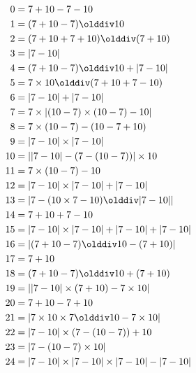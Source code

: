 \allowdisplaybreaks
\begin{align*}
    0   & = 7+10-7-10                                      \\
    1   & = (7+10-7)\olddiv10                              \\
    2   & = (7+10+7+10)\olddiv(7+10)                       \\
    3   & = |7-10|                                         \\
    4   & = (7+10-7)\olddiv10+|7-10|                       \\
    5   & = 7\times10\olddiv(7+10+7-10)                    \\
    6   & = |7-10|+|7-10|                                  \\
    7   & = 7\times|(10-7)\times(10-7)-10|                 \\
    8   & = 7\times(10-7)-(10-7+10)                        \\
    9   & = |7-10|\times|7-10|                             \\
    10  & = ||7-10|-(7-(10-7))|\times10                    \\
    11  & = 7\times(10-7)-10                               \\
    12  & = |7-10|\times|7-10|+|7-10|                      \\
    13  & = |7-(10\times7-10)\olddiv|7-10||                \\
    14  & = 7+10+7-10                                      \\
    15  & = |7-10|\times|7-10|+|7-10|+|7-10|               \\
    16  & = |(7+10-7)\olddiv10-(7+10)|                     \\
    17  & = 7+10                                           \\
    18  & = (7+10-7)\olddiv10+(7+10)                       \\
    19  & = ||7-10|\times(7+10)-7\times10|                 \\
    20  & = 7+10-7+10                                      \\
    21  & = |7\times10\times7\olddiv10-7\times10|          \\
    22  & = |7-10|\times(7-(10-7))+10                      \\
    23  & = |7-(10-7)\times10|                             \\
    24  & = |7-10|\times|7-10|\times|7-10|-|7-10|          \\

\end{align*}
